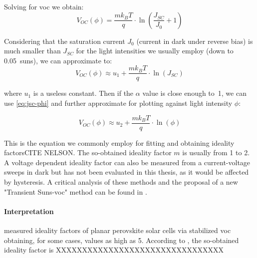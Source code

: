 Solving for \gls{voc} we obtain:
$$V_{OC}(\phi) = \frac{mk_BT}{q}\cdot\ln\left(\frac{J_{SC}}{J_0} + 1\right)$$

Considering that the saturation current $J_0$ (current in dark under reverse bias) is much smaller than $J_{SC}$ for the light intensities we usually employ (down to \SI{0.05}{suns}), we can approximate to:
$$V_{OC}(\phi) \approx u_1 + \frac{mk_BT}{q}\cdot\ln(J_{SC})$$

where $u_1$ is a useless constant. Then if the $\alpha$ value is close enough to~1, we can use \cref{eq:jsc-phi} and further approximate for plotting against light intensity $\phi$:

$$V_{OC}(\phi) \approx u_2 + \frac{mk_BT}{q}\cdot\ln(\phi)$$

This is the equation we commonly employ for fitting and obtaining ideality factorsCITE NELSON. %
The so-obtained ideality factor $m$ is usually from 1 to 2. A voltage dependent ideality factor can also be measured from a current-voltage sweeps in dark but has not been evaluated in this thesis, as it would be affected by hysteresis. A critical analysis of these methods and the proposal of a new "Transient Suns-\gls{voc}" method can be found in . %

\paragraph{Interpretation} %
 measured ideality factors of planar perovskite solar cells via stabilized \gls{voc} obtaining, for some cases, values as high as 5. According to , the so-obtained ideality factor is XXXXXXXXXXXXXXXXXXXXXXXXXXXXXXXX

